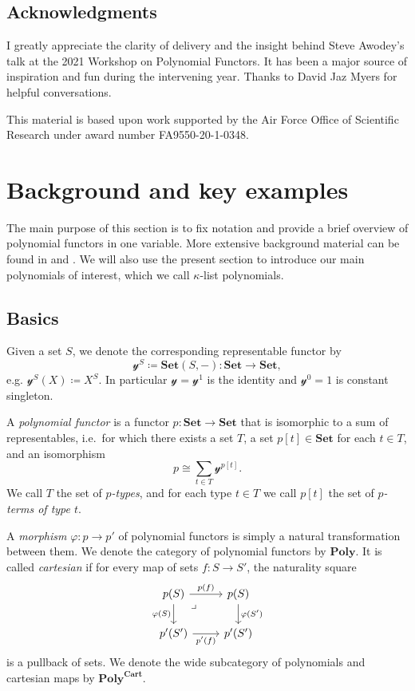 \documentclass[11pt, one side, article]{memoir}
\theoremstyle{definition}
\theoremstyle{plain}
\newenvironment{definition}
  {\pushQED{\qed}\renewcommand{\qedsymbol}{$\lozenge$}\definitionx}
  {\popQED\enddefinitionx}
\newcommand{\Cat}[1]{\mathbf{#1}}%
\newcommand{\smset}{\Cat{Set}}
\newcommand{\yon}{\mathcal{y}}
\newcommand{\poly}{\Cat{Poly}}
\newcommand{\polycart}{\poly^{\Cat{Cart}}}
\newcommand{\0}{\textsf{0}}
\newcommand{\1}{\tn{\textsf{1}}}
\begin{document}
\section{Acknowledgments}

I greatly appreciate the clarity of delivery and the insight behind Steve Awodey's talk at the 2021 Workshop on Polynomial Functors. It has been a major source of inspiration and fun during the intervening year. Thanks to David Jaz Myers for helpful conversations. 

This material is based upon work supported by the Air Force Office of Scientific Research under award number FA9550-20-1-0348.

\chapter{Background and key examples}\label{chap.background}

The main purpose of this section is to fix notation and provide a brief overview of polynomial functors in one variable. More extensive background material can be found in \cite{spivak2022poly} and \cite{kock2012polynomial}. We will also use the present section to introduce our main polynomials of interest, which we call $\kappa$-list polynomials.

\section{Basics}

\begin{definition}[Polynomial functor]\label{def.poly}
Given a set $S$, we denote the corresponding representable functor by
\[\yon^S\coloneqq\smset(S,-)\colon\smset\to\smset,\]
e.g. $\yon^S(X)\coloneqq X^S$. In particular $\yon=\yon^1$ is the identity and $\yon^0=1$ is constant singleton.

A \emph{polynomial functor} is a functor $p\colon\smset\to\smset$ that is isomorphic to a sum of representables, i.e.\ for which there exists a set $T$, a set $p[t]\in\smset$ for each $t\in T$, and an isomorphism
\[
p\cong\sum_{t\in T}\yon^{p[t]}.
\]
We call $T$ the set of \emph{$p$-types}, and for each type $t\in T$ we call $p[t]$ the set of \emph{$p$-terms of type $t$}.%

A \emph{morphism} $\varphi\colon p\to p'$ of polynomial functors is simply a natural transformation between them. We denote the category of polynomial functors by $\poly$. It is called \emph{cartesian} if for every map of sets $f\colon S\to S'$, the naturality square
\[
\begin{tikzcd}
  p(S)\ar[r, "p(f)"]\ar[d, "\varphi(S)"']&p(S)\ar[d, "\varphi(S')"]\\
  p'(S')\ar[r, "p'(f)"']&p'(S')\ar[ul, phantom, very near end, "\lrcorner"]
\end{tikzcd}
\]
is a pullback of sets. We denote the wide subcategory of polynomials and cartesian maps by $\polycart$.
\end{definition}
\end{document}
